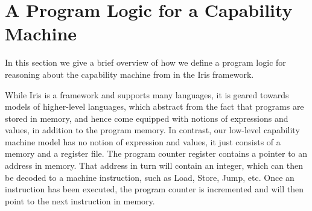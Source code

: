 \documentclass[sigplan,review]{acmart}\settopmatter{printfolios=true,printccs=false,printacmref=false}
\begin{document}
\section{A Program Logic for a Capability Machine}



In this section we give a brief overview of how we define a program logic
for reasoning about the capability machine from \cite{skorstengaardESOP18} in the Iris framework.

While Iris is a framework and supports many languages, it is geared towards models of higher-level languages, which abstract from the fact that programs are stored in memory, and hence come equipped with notions of expressions and values, in addition to the program memory.
In contrast, our low-level capability machine model has no notion of expression and values, it just consists of a memory and a register file.
The program counter register contains a pointer to an address in memory.
That address in turn will contain an integer, which can then be decoded to a machine instruction, such as Load, Store, Jump, etc.
Once an instruction has been executed, the program counter is incremented and will then point to the next instruction in memory.
\end{document}

